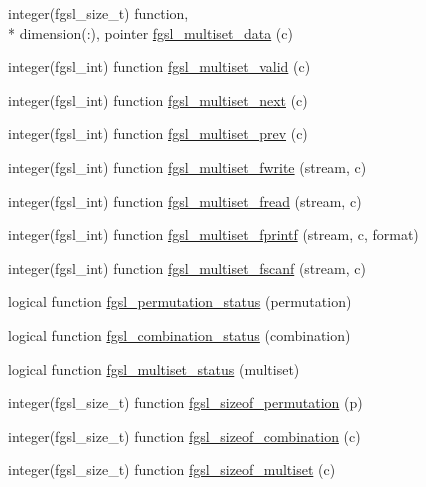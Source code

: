 \begin{DoxyCompactItemize}
\item 
integer(fgsl\-\_\-size\-\_\-t) function, \\*
dimension(\-:), pointer \hyperlink{permutation_8finc_af687c5f061870efcc8d104654d26b88e}{fgsl\-\_\-multiset\-\_\-data} (c)
\item 
integer(fgsl\-\_\-int) function \hyperlink{permutation_8finc_acde8e9dc3c43e69cae5b2679a4e3156e}{fgsl\-\_\-multiset\-\_\-valid} (c)
\item 
integer(fgsl\-\_\-int) function \hyperlink{permutation_8finc_a8448ce578712a0b1e42918d448856052}{fgsl\-\_\-multiset\-\_\-next} (c)
\item 
integer(fgsl\-\_\-int) function \hyperlink{permutation_8finc_a00e824e9ee9cb15a5939c1f7dec2c5e1}{fgsl\-\_\-multiset\-\_\-prev} (c)
\item 
integer(fgsl\-\_\-int) function \hyperlink{permutation_8finc_ad5694529ae97ed0a85ae153737232382}{fgsl\-\_\-multiset\-\_\-fwrite} (stream, c)
\item 
integer(fgsl\-\_\-int) function \hyperlink{permutation_8finc_acf2bf65c017f6537e1751bcd12b43774}{fgsl\-\_\-multiset\-\_\-fread} (stream, c)
\item 
integer(fgsl\-\_\-int) function \hyperlink{permutation_8finc_aa0d4a4609f7410cb0aba15ff56ae5fa4}{fgsl\-\_\-multiset\-\_\-fprintf} (stream, c, format)
\item 
integer(fgsl\-\_\-int) function \hyperlink{permutation_8finc_a9e05fb001350d8e3667f3fbaee59a0ce}{fgsl\-\_\-multiset\-\_\-fscanf} (stream, c)
\item 
logical function \hyperlink{permutation_8finc_a59b2c2f3d7df483019e0a8f270ad6fb5}{fgsl\-\_\-permutation\-\_\-status} (permutation)
\item 
logical function \hyperlink{permutation_8finc_a579b1fdf03f937579abf673f2a436043}{fgsl\-\_\-combination\-\_\-status} (combination)
\item 
logical function \hyperlink{permutation_8finc_ab7dfd6ba20374a426f2b813cf8bf63ec}{fgsl\-\_\-multiset\-\_\-status} (multiset)
\item 
integer(fgsl\-\_\-size\-\_\-t) function \hyperlink{permutation_8finc_aa3a991b00a25f168c7ff9f0df9e327c9}{fgsl\-\_\-sizeof\-\_\-permutation} (p)
\item 
integer(fgsl\-\_\-size\-\_\-t) function \hyperlink{permutation_8finc_aee397495d24c58890649db47f9a17ebf}{fgsl\-\_\-sizeof\-\_\-combination} (c)
\item 
integer(fgsl\-\_\-size\-\_\-t) function \hyperlink{permutation_8finc_a73a0b5bb42cd2a204bbda54a8aa2869d}{fgsl\-\_\-sizeof\-\_\-multiset} (c)
\end{DoxyCompactItemize}


